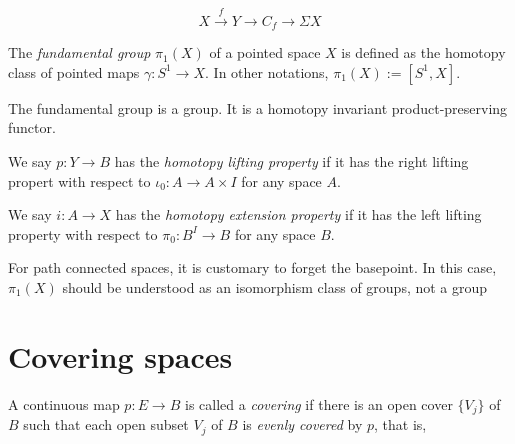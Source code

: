 \documentclass{../../large}
\begin{document}
\[X\xrightarrow{f}Y\to C_f\to\Sigma X\]

\begin{prb}
The \emph{fundamental group} $\pi_1(X)$ of a pointed space $X$ is defined as the homotopy class of pointed maps $\gamma:S^1\to X$.
In other notations, $\pi_1(X):=[S^1,X]$.

The fundamental group is a group.
It is a homotopy invariant product-preserving functor.
\end{prb}

We say $p:Y\to B$ has the \emph{homotopy lifting property} if it has the right lifting propert with respect to $\iota_0:A\to A\times I$ for any space $A$.

We say $i:A\to X$ has the \emph{homotopy extension property} if it has the left lifting property with respect to $\pi_0:B^I\to B$ for any space $B$.



\begin{prb}
For path connected spaces, it is customary to forget the basepoint.
In this case, $\pi_1(X)$ should be understood as an isomorphism class of groups, not a group
\end{prb}

\begin{prb}
\end{prb}

\section{Covering spaces}



\begin{prb}
A continuous map $p:E\to B$ is called a \emph{covering} if there is an open cover $\{V_j\}$ of $B$ such that each open subset $V_j$ of $B$ is \emph{evenly covered} by $p$, that is, 
\end{prb}
\end{document}
